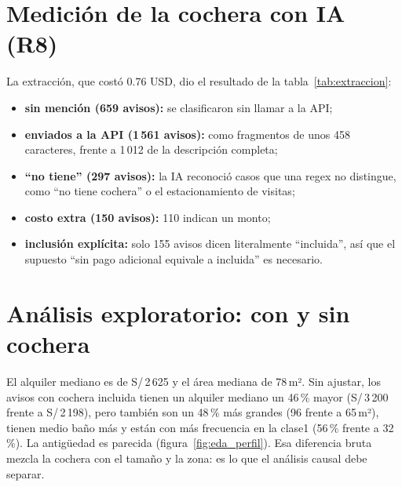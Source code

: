 \begin{table}[H]
\centering\small
\caption{Flujo de exclusiones de la muestra (R1)}\label{tab:exclusiones}
\resizebox{0.92\textwidth}{!}{}
\end{table}

\section{Medición de la cochera con IA (R8)}\label{sec:res_ia}

La extracción, que costó 0.76 USD, dio el resultado de la tabla~\ref{tab:extraccion}:
\begin{itemize}[itemsep=0pt]
\item \textbf{sin mención (659 avisos):} se clasificaron sin llamar a la API;
\item \textbf{enviados a la API (1\,561 avisos):} como fragmentos de unos 458 caracteres, frente a 1\,012 de la descripción completa;
\item \textbf{``no tiene'' (297 avisos):} la IA reconoció casos que una regex no distingue, como ``no tiene cochera'' o el estacionamiento de visitas;
\item \textbf{costo extra (150 avisos):} 110 indican un monto;
\item \textbf{inclusión explícita:} solo 155 avisos dicen literalmente ``incluida'', así que el supuesto ``sin pago adicional equivale a incluida'' es necesario.
\end{itemize}

\begin{table}[H]
\centering\small
\caption{Clasificación de la cochera y uso en el análisis (R8)}\label{tab:extraccion}

\end{table}

\section{Análisis exploratorio: con y sin cochera}\label{sec:res_eda}

El alquiler mediano es de S/\,2\,625 y el área mediana de 78\,m². Sin ajustar, los avisos con cochera incluida tienen un alquiler mediano un 46\,\% mayor (S/\,3\,200 frente a S/\,2\,198), pero también son un 48\,\% más grandes (96 frente a 65\,m²), tienen medio baño más y están con más frecuencia en la clase1 (56\,\% frente a 32\,\%). La antigüedad es parecida (figura~\ref{fig:eda_perfil}). Esa diferencia bruta mezcla la cochera con el tamaño y la zona: es lo que el análisis causal debe separar.

